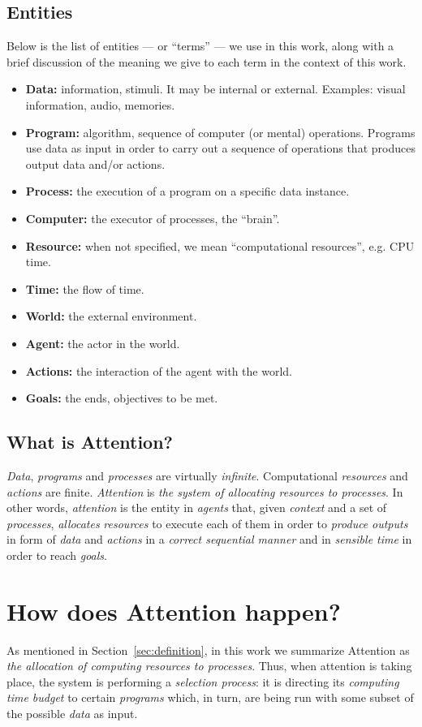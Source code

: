 \documentclass[11pt]{article}
\begin{document}
\subsection{Entities}
Below is the list of entities --- or ``terms'' --- we use in this work, along with a brief discussion of the meaning
we give to each term in the context of this work.

\begin{itemize}
    \item\textbf{Data:} information, stimuli. It may be internal or external. Examples: visual information, audio, memories.
    \item\textbf{Program:} algorithm, sequence of computer (or mental) operations. Programs use data as input in order to carry out a sequence of operations that produces output data and/or actions.
    \item\textbf{Process:} the execution of a program on a specific data instance.
    \item\textbf{Computer:} the executor of processes, the “brain”.
    \item\textbf{Resource:} when not specified, we mean “computational resources”, e.g. CPU time.
    \item\textbf{Time:} the flow of time.
    \item\textbf{World:} the external environment.
    \item\textbf{Agent:} the actor in the world.
    \item\textbf{Actions:} the interaction of the agent with the world.
    \item\textbf{Goals:} the ends, objectives to be met.
\end{itemize}

\subsection{What is Attention?}
\emph{Data}, \emph{programs} and \emph{processes} are virtually \emph{infinite}.
Computational \emph{resources} and \emph{actions} are finite.
\emph{Attention} is \emph{the system of allocating resources to processes}.
In other words, \emph{attention} is the entity in \emph{agents} that, given \emph{context} and a set of \emph{processes},
\emph{allocates} \emph{resources} to execute each of them in order to \emph{produce} \emph{outputs} in form of \emph{data} and \emph{actions} in a \emph{correct sequential manner} and in \emph{sensible time} in order to reach \emph{goals}.

\section{How does Attention happen?}\label{sec:taxonomy}
As mentioned in Section~\ref{sec:definition},
in this work we summarize Attention as \emph{the allocation of computing resources to processes}.
Thus, when attention is taking place, the system is performing a \emph{selection process}: it is directing its \emph{computing time budget} to certain \emph{programs} which,
in turn, are being run with some subset of the possible \emph{data} as input.
\end{document}
